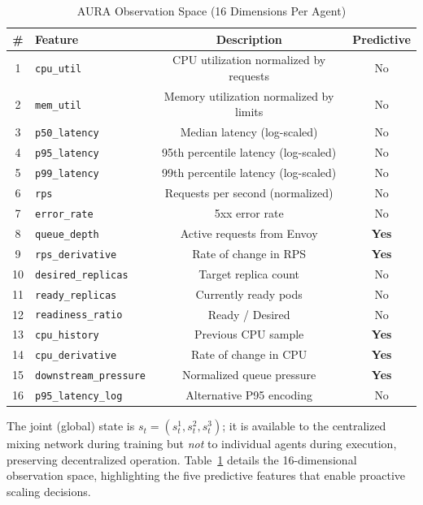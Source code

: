 \documentclass[conference]{IEEEtran}
\begin{document}
\begin{table}[t]
\centering
\caption{AURA Observation Space (16 Dimensions Per Agent)}
\label{tab:obs-space}
\setlength{\tabcolsep}{4pt}
\begin{tabular}{clcc}
\toprule
\textbf{\#} & \textbf{Feature} & \textbf{Description} & \textbf{Predictive} \\
\midrule
1 & \texttt{cpu\_util} & CPU utilization normalized by requests & No \\
2 & \texttt{mem\_util} & Memory utilization normalized by limits & No \\
3 & \texttt{p50\_latency} & Median latency (log-scaled) & No \\
4 & \texttt{p95\_latency} & 95th percentile latency (log-scaled) & No \\
5 & \texttt{p99\_latency} & 99th percentile latency (log-scaled) & No \\
6 & \texttt{rps} & Requests per second (normalized) & No \\
7 & \texttt{error\_rate} & 5xx error rate & No \\
8 & \texttt{queue\_depth} & Active requests from Envoy & \textbf{Yes} \\
9 & \texttt{rps\_derivative} & Rate of change in RPS & \textbf{Yes} \\
10 & \texttt{desired\_replicas} & Target replica count & No \\
11 & \texttt{ready\_replicas} & Currently ready pods & No \\
12 & \texttt{readiness\_ratio} & Ready / Desired & No \\
13 & \texttt{cpu\_history} & Previous CPU sample & \textbf{Yes} \\
14 & \texttt{cpu\_derivative} & Rate of change in CPU & \textbf{Yes} \\
15 & \texttt{downstream\_pressure} & Normalized queue pressure & \textbf{Yes} \\
16 & \texttt{p95\_latency\_log} & Alternative P95 encoding & No \\
\bottomrule
\end{tabular}
\end{table}

The joint (global) state is $s_t = (s_t^1, s_t^2, s_t^3)$; it is
available to the centralized mixing network during training but
\emph{not} to individual agents during execution, preserving
decentralized operation. Table~\ref{tab:obs-space} details the
16-dimensional observation space, highlighting the five predictive
features that enable proactive scaling decisions.
\end{document}
